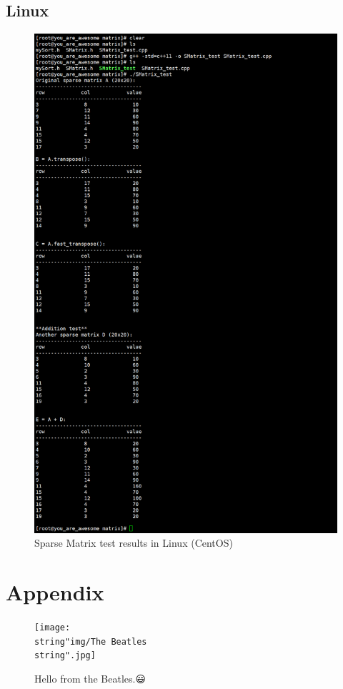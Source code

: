 \documentclass{article}
\begin{document}
	\clearpage
	\subsection{Linux}
	\begin{figure}[!hb]
		\centering
		\includegraphics[width=0.75\linewidth]{img/sparse_matrix_tests_centos}
		\caption{Sparse Matrix test results in Linux (CentOS)}
		\label{fig:sparsematrixtestscentos}
	\end{figure}
	

	\section{Appendix}
	\begin{figure}[!hb]
		\centering
		\texttt{[image: \\string"img/The 
			Beatles\\string".jpg]}
		\caption*{Hello from the Beatles.😃}
		\label{fig:the-beatles}
	\end{figure}
	
\end{document}
